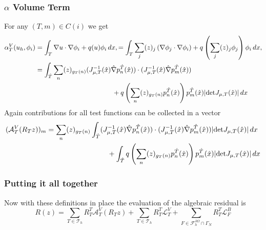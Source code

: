 \documentclass[a4paper,12pt]{article}
\begin{document}
\subsubsection*{$\alpha$ Volume Term}

For any $(T,m)\in C(i)$ we get
\begin{equation*}
\begin{split}
\alpha_T^V(u_h,\phi_i) &= \int_T \nabla u \cdot \nabla \phi_i + q(u) \phi_i \,dx,
= \int_T \sum_j (z)_j \left(\nabla \phi_j \cdot \nabla \phi_i \right) 
+ q\left( \sum_j (z)_j \phi_j \right) \phi_i \,dx,\\
&= \int_{\hat T} \sum_{n} (z)_{g_T(n)} (J_{\mu,T}^{-1}(\hat x) \hat\nabla p_n^{\hat T}(\hat x) )
\cdot (J_{\mu,T}^{-1}(\hat x) \hat\nabla p_m^{\hat T}(\hat x) ) \\
&\hspace{40mm}+ q\left( \sum_n (z)_{g_T(n)} p_n^{\hat T}(\hat x) \right) p_m^{\hat T}(\hat x) 
|\text{det} J_{\mu,T}(\hat x)| \,dx
\end{split}
\end{equation*}
Again contributions for all test functions can be collected in a vector
\begin{equation*}
\begin{split}
(\mathcal{A}_T^V(R_T z))_m &=
\sum_{n} (z)_{g_T(n)} \int_{\hat T} (J_{\mu,T}^{-1}(\hat x) \hat\nabla p_n^{\hat T}(\hat x) )
\cdot (J_{\mu,T}^{-1}(\hat x) \hat\nabla p_m^{\hat T}(\hat x) ) |\text{det} J_{\mu,T}(\hat x)| \,dx\\
&\hspace{30mm}+ \int_{\hat T} q\left( \sum_n (z)_{g_T(n)} p_n^{\hat T}(\hat x) \right) p_m^{\hat T}(\hat x) 
|\text{det} J_{\mu,T}(\hat x)| \,dx
\end{split}
\end{equation*}


\subsubsection*{Putting it all together}

Now with these definitions in place the evaluation of the algebraic residual is
\begin{equation*}
R(z) = 
\sum_{T\in\mathcal{T}_h} R_T^T \mathcal{A}_T^V(R_T z)
  + \sum_{T\in\mathcal{T}_h} R_T^T \mathcal{L}_T^V
 + \sum_{F\in\mathcal{F}_h^{\partial\Omega}\cap\Gamma_N} R_T^T \mathcal{L}_F^B
\end{equation*}
\end{document}
